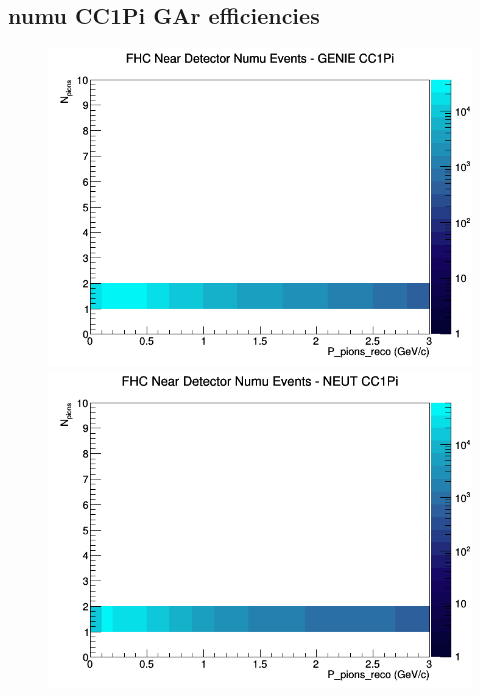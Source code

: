 \documentclass[12pt]{article}
\begin{document}
\subsection{numu CC1Pi GAr efficiencies}
\begin{figure}[h]
\includegraphics[width=\linewidth]{eff_N_P/GAr/pions/CC1Pi_FHC_ND_numu_N_P_GENIE.png}
\endminipage
{}
\includegraphics[width=\linewidth]{eff_N_P/GAr/pions/CC1Pi_FHC_ND_numu_N_P_NEUT.png}
\endminipage
{}

\end{figure}
\end{document}
